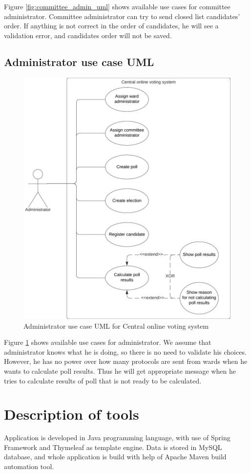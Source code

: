 \documentclass[a4paper,twoside,12pt]{book}
\newcommand{\Title}{Central online voting system}
\begin{document}
    Figure \ref{fig:committee_admin_uml} shows available use cases for committee administrator. Committee administrator can try to send closed list candidates' order.
    If anything is not correct in the order of candidates, he will see a validation error, and candidates order will not be saved.
    \pagebreak

    \subsection{Administrator use case UML}
    \begin{figure}[h]
      \centering
      \includegraphics[width=0.8\linewidth]{admin_uml.png}
      \caption{Administrator use case UML for \Title}
      \label{fig:admin_uml}
    \end{figure}

    Figure \ref{fig:admin_uml} shows available use cases for administrator. We assume that administrator knows what he is doing, so there is no need to validate his choices.
    However, he has no power over how many protocols are sent from wards when he wants to calculate poll results. 
    Thus he will get appropriate message when he tries to calculate results of poll that is not ready to be calculated.

  \section{Description of tools}
    Application is developed in Java programming language, with use of Spring Framework and Thymeleaf as template engine. 
    Data is stored in MySQL database, and whole application is build with help of Apache Maven build automation tool.
\end{document}

